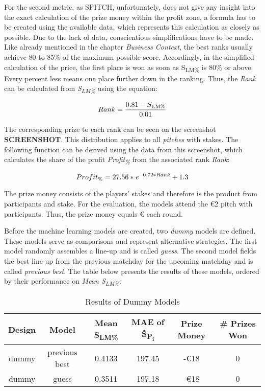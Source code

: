 For the second metric, as SPITCH, unfortunately, does not give any insight into the exact calculation of the prize money within the profit zone, a formula has to be created using the available data, which represents this calculation as closely as possible. Due to the lack of data, conscientious simplifications have to be made. Like already mentioned in the chapter \emph{Business Context}, the best ranks usually achieve 80 to 85\% of the maximum possible score. Accordingly, in the simplified calculation of the price, the first place is won as soon as S\textsubscript{LM\%} is 80\% or above. Every percent less means one place further down in the ranking. Thus, the \emph{Rank} can be calculated from \emph{S\textsubscript{LM\%}} using the equation:

\begin{equation}
    Rank = \frac{0.81 - S\textsubscript{LM\%}}{0.01} 
    \label{eq:percentage_of_best_score_to_rank}
\end{equation}

The corresponding prize to each rank can be seen on the screenshot \textbf{SCREENSHOT}. This distribution applies to all \emph{pitches} with stakes. The following function can be derived using the data from this screenshot, which calculates the share of the profit \emph{Profit\textsubscript{\%}} from the associated rank \emph{Rank}:

\begin{equation}
    Profit\textsubscript{\%} = 27.56 * \emph{e}^{-0.72 * Rank} + 1.3 
    \label{eq:rank_to_profit}
\end{equation}

The prize money consists of the players' stakes and therefore is the product from participants and stake. For the evaluation, the models attend the €2 pitch with  participants. Thus, the prize money equals € each round.

Before the machine learning models are created, two \emph{dummy} models are defined. These models serve as comparisons and represent alternative strategies. The first model randomly assembles a line-up and is called \emph{guess}. The second model fields the best line-up from the previous matchday for the upcoming matchday and is called \emph{previous best}. The table below presents the results of these models, ordered by their performance on \emph{Mean S\textsubscript{LM\%}}:

\begin{table}[H]
    \renewcommand{\arraystretch}{1.0}
    \caption{Results of Dummy Models}
    \label{tab:results_of_dummy_models}
    \begin{tabular}{@{}cccccc@{}}
    \toprule
    \textbf{Design} & \textbf{Model} & \textbf{Mean S\textsubscript{LM\%}} & \textbf{MAE of \^{S}\textsubscript{P\textsubscript{i}}} & \textbf{Prize Money} & \textbf{\# Prizes Won} \\ \midrule
    dummy   & previous best & 0.4133 & 197.45 & -€18 & 0 \\
    dummy   & guess         & 0.3511 & 197.18 & -€18 & 0 \\ \bottomrule
    \end{tabular}
\end{table}

